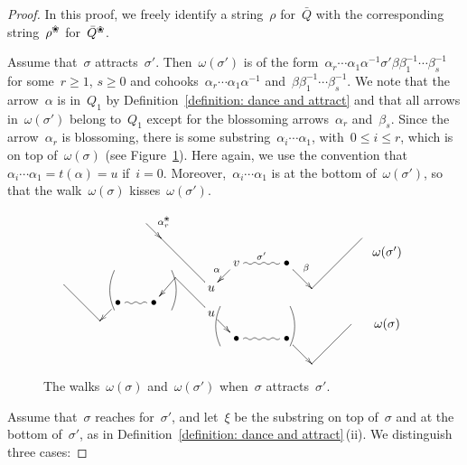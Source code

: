 \documentclass{memo-l}
\theoremstyle{definition}
\newcommand{\blossom}{^\text{\ding{96}}} %
\begin{document}
\begin{proof}
In this proof, we freely identify a string~$\rho$ for~$\bar Q$ with the corresponding string~$\rho\blossom$ for~$\bar Q\blossom$.

Assume that~$\sigma$ attracts~$\sigma'$.
Then~$\omega(\sigma')$ is of the form~$\alpha_r\cdots\alpha_1\alpha^{-1}\sigma'\beta\beta_1^{-1}\cdots\beta_s^{-1}$ for some~${r \geq 1}$, ${s\geq 0}$ and cohooks~$\alpha_r\cdots\alpha_1\alpha^{-1}$ and~$\beta\beta_1^{-1}\cdots\beta_s^{-1}$.
We note that the arrow~$\alpha$ is in~$Q_1$ by Definition~\ref{definition: dance and attract} and that all arrows in~$\omega(\sigma')$ belong to~$Q_1$ except for the blossoming arrows~$\alpha_r$ and~$\beta_s$.
Since the arrow~$\alpha_r$ is blossoming, there is some substring~$\alpha_i\cdots\alpha_1$, with~$0\leq i \leq r$, which is on top of~$\omega(\sigma)$ (see Figure~\ref{fig: sigma attracts sigma'}).
Here again, we use the convention that~$\alpha_i\cdots\alpha_1 = t(\alpha)= u$ if~$i=0$. 
Moreover,~$\alpha_i\cdots\alpha_1$ is at the bottom of~$\omega(\sigma')$, so that the walk~$\omega(\sigma)$ kisses~$\omega(\sigma')$.

\begin{figure}[h]
 	\capstart
\[
\xy
%
(35,10)*+{\omega(\sigma')};
(-28,14)="lpeak";
(-14,0)*+{u}="-12";
(-7,7)*+{v}="-11";
(7,7)*+{\bullet}="11";
(14,0)="12";
(28,14)="rpeak";
%
(35,-10)*+{\omega(\sigma)};
(-55,1)="1";
(-45,-9)="2";
(-40,-4)*+{\bullet}="3";
(-30,-4)*+{\bullet}="4";
(-24,3)="5";
(-14,-7)*+{u}="u";
(-7,-14)*+{\bullet}="a";
(7,-14)*+{\bullet}="b";
(14,-21)="c";
(25,-10)="d";
%
{\ar^{\alpha_r\blossom} (-32,18);"lpeak"};
{\ar@{-} "lpeak";"-12"};
{\ar_{\alpha} "-11";"-12"};
{\ar@{~}^{\sigma'} "-11";"11"};
{\ar^{\beta} "11";"12"};
{\ar@{-} "12";"rpeak"};
%
{\ar@{-} "1";"2"};
{\ar "3";"2"};
{\ar@{~} "3";"4"};
{\ar "5";"4"};
{\ar@{-} "5";"u"};
{\ar "u";"a"};
{\ar@{~} "a";"b"};
{\ar "b";"c"};
{\ar@{-} "c";"d"};
%
{\ar@/_.3pc/@{-} (-11.5,-5);(-11.5,-16)};
{\ar@/^.3pc/@{-} (8,-5);(8,-16)};
%
{\ar@/_.3pc/@{-} (-41,5);(-41,-6)};
{\ar@/^.3pc/@{-} (-25,5);(-25,-6)};
%
\endxy
\]
    \caption{The walks~$\omega(\sigma)$ and~$\omega(\sigma')$ when~$\sigma$ attracts~$\sigma'$.}
    \label{fig: sigma attracts sigma'}
\end{figure}

Assume that~$\sigma$ reaches for~$\sigma'$, and let~$\xi$ be the substring on top of~$\sigma$ and at the bottom of~$\sigma'$, as in Definition~\ref{definition: dance and attract}\,(ii).
We distinguish three cases:


\end{proof}
\end{document}
